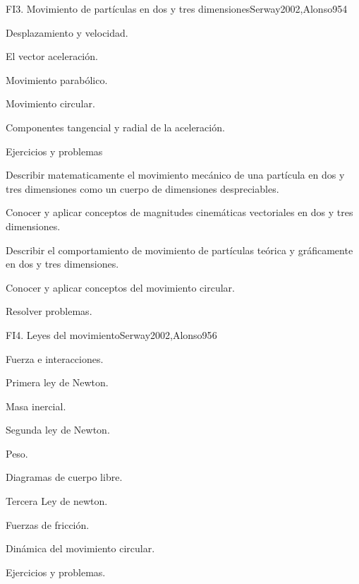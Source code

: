 \begin{sumilla}
\begin{unit}{FI3. Movimiento de part\'iculas en dos y tres dimensiones}{Serway2002,Alonso95}{4}
\begin{topicos}
      \item Desplazamiento y velocidad.
      \item El vector aceleraci\'on.
      \item Movimiento parab\'olico.
      \item Movimiento circular.
      \item Componentes tangencial y radial de la aceleraci\'on.
      \item Ejercicios y problemas
\end{topicos}

   \begin{objetivos}
      \item Describir matematicamente el movimiento mec\'anico de una part\'icula en dos y tres dimensiones como un cuerpo de dimensiones despreciables.
      \item Conocer y aplicar conceptos de magnitudes cinem\'aticas vectoriales en dos y tres dimensiones.
      \item Describir el comportamiento de movimiento de part\'iculas te\'orica y gr\'aficamente en dos y tres dimensiones.
      \item Conocer y aplicar conceptos del movimiento circular.
      \item Resolver problemas.
   \end{objetivos}
\end{unit}

\begin{unit}{FI4. Leyes del movimiento}{Serway2002,Alonso95}{6}
\begin{topicos}
      \item Fuerza e interacciones.
      \item Primera ley de Newton.
      \item Masa inercial.
      \item Segunda ley de Newton.
      \item Peso.
      \item Diagramas de cuerpo libre.
      \item Tercera Ley de newton.
      \item Fuerzas de fricci\'on.
      \item Din\'amica del movimiento circular.
      \item Ejercicios y problemas.
   \end{topicos}


\end{unit}
\end{sumilla}
